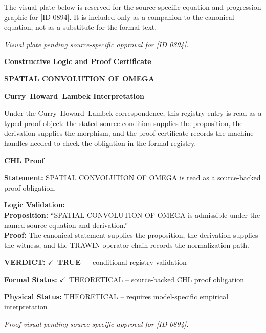 \begingroup\footnotesize\sloppy
The visual plate below is reserved for the source-specific equation and progression graphic for [ID 0894]. It is included only as a companion to the canonical equation, not as a substitute for the formal text.
\par\endgroup
\begingroup\footnotesize\itshape
Visual plate pending source-specific approval for [ID 0894].
\par\endgroup

\clearpage
\begingroup\tzpsupportsetup
\noindent\textbf{\fontsize{10.8pt}{12.8pt}\selectfont [ID 0894] Constructive Logic and Proof Certificate}\par
\noindent\textbf{\fontsize{10pt}{12pt}\selectfont SPATIAL CONVOLUTION OF OMEGA}\par
\vspace{0.45em}
\begingroup
\footnotesize
\setlength{\parskip}{0.22em}
\setlength{\parindent}{0pt}
\noindent\textbf{Curry--Howard--Lambek Interpretation}\par
Under the Curry--Howard--Lambek correspondence, this registry entry is read as a typed proof
object: the stated source condition supplies the proposition, the derivation supplies the
morphism, and the proof certificate records the machine handles needed to check the obligation
in the formal registry.

\vspace{0.45em}
\noindent\textbf{CHL Proof}\par
\textbf{Statement:} SPATIAL CONVOLUTION OF OMEGA is read as a source-backed proof obligation.

\textbf{Logic Validation:}\\
\textbf{Proposition:} ``SPATIAL CONVOLUTION OF OMEGA is admissible under the named source equation and derivation.''\\
\textbf{Proof:} The canonical statement supplies the proposition, the derivation supplies the witness, and the TRAWIN operator chain records the normalization path.

\textbf{VERDICT:} \ensuremath{\checkmark}\ \textbf{TRUE} --- conditional registry validation

\textbf{Formal Status:} \ensuremath{\checkmark}\ THEORETICAL -- source-backed CHL proof obligation

\textbf{Physical Status:} THEORETICAL -- requires model-specific empirical interpretation
\par\vspace{0.45em}
\par
\vfill
\begingroup\footnotesize\itshape
Proof visual pending source-specific approval for [ID 0894].
\par\endgroup
\vfill
\endgroup
\endgroup
